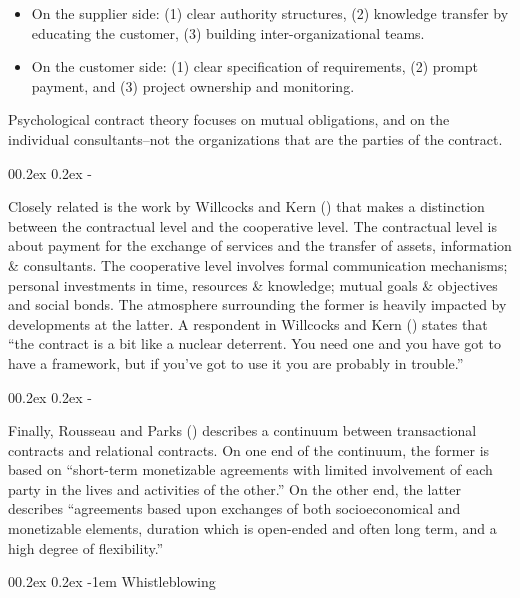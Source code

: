 \documentclass[
  man,floatsintext]{apa6}
\makeatletter
\providecommand{\tightlist}{%
  \setlength{\itemsep}{0pt}\setlength{\parskip}{0pt}}
\let\oldparagraph\paragraph
\renewcommand{\paragraph}[1]{\oldparagraph{#1}\mbox{}}
\let\oldsubparagraph\subparagraph
\renewcommand{\subparagraph}[1]{\oldsubparagraph{#1}\mbox{}}
\renewcommand{\paragraph}{\@startsection{paragraph}{4}{\parindent}%
  {0\baselineskip \@plus 0.2ex \@minus 0.2ex}%
  {-1em}%
  {\normalfont\normalsize\bfseries\itshape\typesectitle}}
\renewcommand{\subparagraph}[1]{\@startsection{subparagraph}{5}{1em}%
  {0\baselineskip \@plus 0.2ex \@minus 0.2ex}%
  {-\z@\relax}%
  {\normalfont\normalsize\itshape\hspace{\parindent}{#1}\textit{\addperi}}{\relax}}
\makeatother
\begin{document}
\begin{itemize}
\tightlist
\item
  On the supplier side: (1) clear authority structures, (2) knowledge transfer by educating the customer, (3) building inter-organizational teams.
\item
  On the customer side: (1) clear specification of requirements, (2) prompt payment, and (3) project ownership and monitoring.
\end{itemize}

Psychological contract theory focuses on mutual obligations, and on the individual consultants--not the organizations that are the parties of the contract.

\subparagraph{Cooperative-level contracts}\label{cooperative-level-contracts}

Closely related is the work by Willcocks and Kern () that makes a distinction between the contractual level and the cooperative level. The contractual level is about payment for the exchange of services and the transfer of assets, information \& consultants. The cooperative level involves formal communication mechanisms; personal investments in time, resources \& knowledge; mutual goals \& objectives and social bonds. The atmosphere surrounding the former is heavily impacted by developments at the latter. A respondent in Willcocks and Kern () states that ``the contract is a bit like a nuclear deterrent. You need one and you have got to have a framework, but if you've got to use it you are probably in trouble.''

\subparagraph{Relational contracts}\label{relational-contracts}

Finally, Rousseau and Parks () describes a continuum between transactional contracts and relational contracts. On one end of the continuum, the former is based on ``short-term monetizable agreements with limited involvement of each party in the lives and activities of the other.'' On the other end, the latter describes ``agreements based upon exchanges of both socioeconomical and monetizable elements, duration which is open-ended and often long term, and a high degree of flexibility.''

\paragraph{Whistleblowing}\label{whistleblowing}
\end{document}
